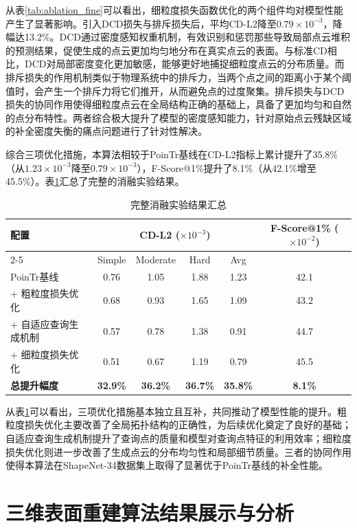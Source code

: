 从表\ref{tab:ablation_fine}可以看出，细粒度损失函数优化的两个组件均对模型性能产生了显著影响。引入DCD损失与排斥损失后，平均CD-L2降至$0.79 \times 10^{-3}$，降幅达13.2\%。DCD通过密度感知权重机制，有效识别和惩罚那些导致局部点云堆积的预测结果，促使生成的点云更加均匀地分布在真实点云的表面。与标准CD相比，DCD对局部密度变化更加敏感，能够更好地捕捉细粒度点云的分布质量。而排斥损失的作用机制类似于物理系统中的排斥力，当两个点之间的距离小于某个阈值时，会产生一个排斥力将它们推开，从而避免点的过度聚集。排斥损失与DCD损失的协同作用使得细粒度点云在全局结构正确的基础上，具备了更加均匀和自然的点分布特性。两者综合极大提升了模型的密度感知能力，针对原始点云残缺区域的补全密度失衡的痛点问题进行了针对性解决。

综合三项优化措施，本算法相较于PoinTr基线在CD-L2指标上累计提升了35.8\%（从$1.23 \times 10^{-3}$降至$0.79 \times 10^{-3}$），F-Score@1\%提升了8.1\%（从42.1\%增至45.5\%）。表\ref{tab:ablation_summary}汇总了完整的消融实验结果。
\FloatBarrier
\begin{table}[!htbp]
\centering
\caption{完整消融实验结果汇总}
\label{tab:ablation_summary}
\begin{tabular}{lccccc}
\toprule
\multirow{2}{*}{配置} & \multicolumn{4}{c}{CD-L2 ($\times 10^{-3}$)} & \multirow{2}{*}{F-Score@1\% ($\times 10^{-2}$)} \\
\cmidrule(lr){2-5}
& Simple & Moderate & Hard & Avg & \\
\midrule
PoinTr基线 & 0.76 & 1.05 & 1.88 & 1.23 & 42.1 \\
+ 粗粒度损失优化 & 0.68 & 0.93 & 1.65 & 1.09 & 43.2 \\
+ 自适应查询生成机制 & 0.57 & 0.78 & 1.38 & 0.91 & 44.7 \\
+ 细粒度损失优化 & 0.51 & 0.67 & 1.19 & 0.79 & 45.5 \\
\midrule
\textbf{总提升幅度} & \textbf{32.9\%} & \textbf{36.2\%} & \textbf{36.7\%} & \textbf{35.8\%} & \textbf{8.1\%} \\
\bottomrule
\end{tabular}
\end{table}
\FloatBarrier

从表\ref{tab:ablation_summary}可以看出，三项优化措施基本独立且互补，共同推动了模型性能的提升。粗粒度损失优化主要改善了全局拓扑结构的正确性，为后续优化奠定了良好的基础；自适应查询生成机制提升了查询点的质量和模型对查询点特征的利用效率；细粒度损失优化则进一步改善了生成点云的分布均匀性和局部细节质量。三者的协同作用使得本算法在ShapeNet-34数据集上取得了显著优于PoinTr基线的补全性能。

\section{三维表面重建算法结果展示与分析}

